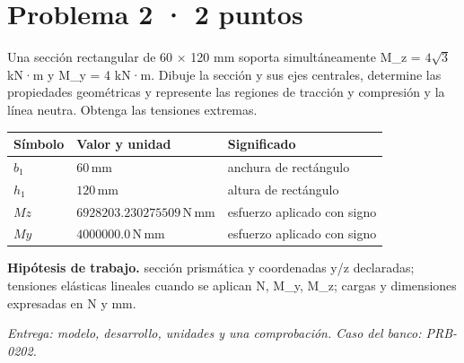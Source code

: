 \par\medskip\noindent\begin{minipage}{\linewidth}

\section{Problema 2 · 2 puntos}

Una sección rectangular de 60 \ensuremath{\times} 120 mm soporta simultáneamente M\_z = $4\sqrt{3}$ kN·m y M\_y = 4 kN·m. Dibuje la sección y sus ejes centrales, determine las propiedades geométricas y represente las regiones de tracción y compresión y la línea neutra. Obtenga las tensiones extremas.

\par\medskip\noindent\begin{tabular}{@{}p{.18\linewidth}p{.26\linewidth}p{.48\linewidth}@{}}
\toprule Símbolo & Valor y unidad & Significado\\\midrule
$b_{1}$ & $60\,\mathrm{mm}$ & anchura de rectángulo\\
$h_{1}$ & $120\,\mathrm{mm}$ & altura de rectángulo\\
$Mz$ & $6928203.230275509\,\mathrm{N\,mm}$ & esfuerzo aplicado con signo\\
$My$ & $4000000.0\,\mathrm{N\,mm}$ & esfuerzo aplicado con signo\\
\bottomrule\end{tabular}\par\medskip



\par\textbf{Hipótesis de trabajo.} sección prismática y coordenadas y/z declaradas; tensiones elásticas lineales cuando se aplican N, M\_y, M\_z; cargas y dimensiones expresadas en N y mm.

\par\textit{Entrega: modelo, desarrollo, unidades y una comprobación. Caso del banco: PRB-0202.}\end{minipage}\par\medskip


